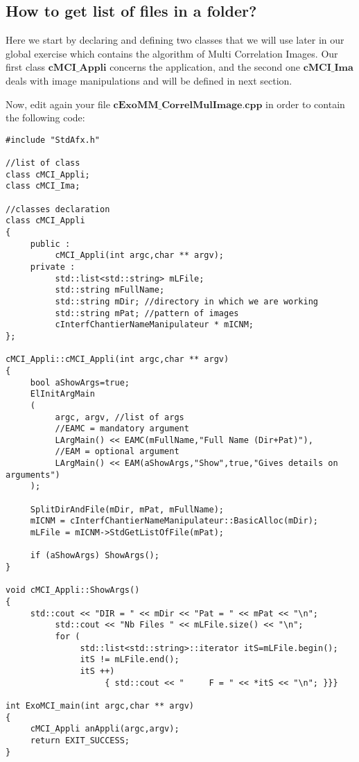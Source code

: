 \documentclass[a4paper]{book}
\begin{document}
\subsection{How to get list of files in a folder?}
Here we start by declaring and defining two classes that we will use later in our global exercise which contains the algorithm of Multi Correlation Images. Our first class $\textbf{cMCI\_Appli}$ concerns the application, and the second one $\textbf{cMCI\_Ima}$ deals with image manipulations and will be defined in next section. \newline

Now, edit again your file $\textbf{cExoMM\_CorrelMulImage.cpp}$ in order to contain the following code:

\begin{lstlisting}
#include "StdAfx.h"

//list of class
class cMCI_Appli;
class cMCI_Ima;

//classes declaration
class cMCI_Appli
{
     public :
          cMCI_Appli(int argc,char ** argv);
     private :
          std::list<std::string> mLFile;
          std::string mFullName;
          std::string mDir; //directory in which we are working
          std::string mPat; //pattern of images
          cInterfChantierNameManipulateur * mICNM;
};

cMCI_Appli::cMCI_Appli(int argc,char ** argv)
{
     bool aShowArgs=true;
     ElInitArgMain
     (
          argc, argv, //list of args
          //EAMC = mandatory argument
          LArgMain() << EAMC(mFullName,"Full Name (Dir+Pat)"),
          //EAM = optional argument
          LArgMain() << EAM(aShowArgs,"Show",true,"Gives details on arguments")
     );

     SplitDirAndFile(mDir, mPat, mFullName);
     mICNM = cInterfChantierNameManipulateur::BasicAlloc(mDir);
     mLFile = mICNM->StdGetListOfFile(mPat);

     if (aShowArgs) ShowArgs();
}

void cMCI_Appli::ShowArgs()
{
     std::cout << "DIR = " << mDir << "Pat = " << mPat << "\n";
          std::cout << "Nb Files " << mLFile.size() << "\n";
          for (
               std::list<std::string>::iterator itS=mLFile.begin();
               itS != mLFile.end();
               itS ++)
                    { std::cout << "     F = " << *itS << "\n"; }}}

int ExoMCI_main(int argc,char ** argv)
{
     cMCI_Appli anAppli(argc,argv);
     return EXIT_SUCCESS;
}
\end{lstlisting}
\end{document}
